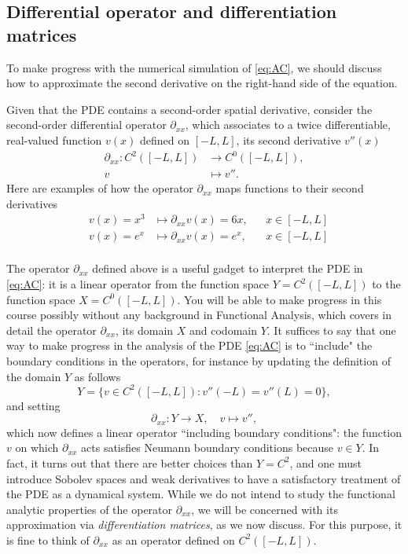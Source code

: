 \documentclass[a4paper]{siamart220329}
\theoremstyle{plain}
\begin{document}
\subsection{Differential operator and differentiation matrices} To make progress with the numerical simulation of
\cref{eq:AC}, we should discuss how to approximate the second derivative on the
right-hand side of the equation. 

Given that the PDE contains a second-order spatial derivative, consider the second-order differential operator $\partial_{xx}$, which associates to
a twice differentiable, real-valued function $v(x)$ defined on $[-L,L]$, its second
derivative $v''(x)$
\[
  \begin{aligned}
    \partial_{xx} \colon  C^2([-L,L]) & \to C^0([-L,L]), \\
                       v           & \mapsto v''.
  \end{aligned}
\]
Here are examples of how the operator $\partial_{x x}$ maps functions to their
second derivatives
\[
  \begin{aligned}
  & v(x) = x^3 & \mapsto \partial_{xx} v(x) = 6 x, & & x \in [-L,L] \\
  & v(x) = e^x & \mapsto \partial_{xx} v(x) = e^x, & & x \in [-L,L] \\
  \end{aligned}
\]

The operator $\partial_{x x}$ defined above is a useful gadget to interpret the PDE
in \cref{eq:AC}: it is a linear operator from the function space $Y = C^2([-L,L])$
to the function space $X = C^0([-L,L])$. You will be able to make progress in this
course possibly without any background in Functional Analysis, which covers in detail the
operator $\partial_{xx}$, its domain $X$ and codomain $Y$. It suffices to say that
one way to make progress in the analysis of the PDE \cref{eq:AC} is to ``include" the
boundary conditions in the operators, for instance by updating the definition of the
domain $Y$
as follows
\[
  Y = \{ v \in C^2([-L,L]) \colon v''(-L) = v''(L) = 0 \},
\]
and setting
\begin{equation}\label{eq:dxx}
  \partial_{xx} \colon  Y \to X, \quad v \mapsto v'',
\end{equation}
which now defines a linear operator ``including boundary conditions": the function
$v$ on which $\partial_{xx}$ acts satisfies Neumann boundary conditions because $v
\in Y$. In fact, it turns out that there are better choices than $Y= C^2$, and one
must introduce Sobolev spaces and weak derivatives to have a satisfactory treatment
of the PDE as a dynamical system. While we do not
intend to study the functional analytic properties of the operator $\partial_{x x}$,
we will be concerned with its approximation via \textit{differentiation matrices}, as
we now discuss. For this purpose, it is fine to think of $\partial_{xx}$ as an
operator defined on $C^2([-L,L])$.
\end{document}
